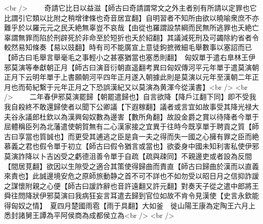 <br />
　　奇請它比日以益滋【師古曰奇請謂常文之外主者别有所請以定罪也它比謂引它類以比附之稍增律條也奇音居宜翻】自明習者不知所由欲以曉喻衆庶不亦難乎於以羅元元之民夭絶無辜豈不哀哉【由從也羅謂設禁綱而民無所逃罪也夭絶亡辜謂無罪而陷於刑辟死於非命至於短折也夭於紹翻】其議減死刑及可蠲除約省者令較然易知條奏【易以豉翻】時有司不能廣宣上意徒鉤摭微細毛舉數事以塞詔而已【師古曰毛舉言舉毫毛之事輕小之甚塞猶當也塞悉則翻】　匈奴單于遣右臯林王伊邪莫演等奉獻朝正月【師古曰演音衍朝直遥翻考異曰匈奴傳河平元年單于遣莫演朝正月下云明年單于上書願朝河平四年正月遂入朝據此則是莫演以元年至漢朝二年正月也而荀紀繫于元年正月之下恐誤漢紀又以莫演為黄渾今從漢書】<br />
<br />
　　二年春伊邪莫演罷歸【朝罷遣歸也】自言欲降【降戶江翻下同】即不受我我自殺終不敢還歸使者以聞下公卿議【下遐稼翻】議者或言宜如故事受其降光禄大夫谷永議郎杜欽以為漢興匈奴數為邊害【數所角翻】故設金爵之賞以待降者今單于屈體稱臣列為北藩遣使朝賀無有二心漢家接之宜異于往時今既享單于聘貢之質【師古曰享當也質誠也】而更受其逋逃之臣是貪一夫之得而失一國之心擁有罪之臣而絶慕義之君也假令單于初立【師古曰假令猶言或當也】欲委身中國未知利害私使伊邪莫演詐降以卜吉凶受之虧德沮善令單于自疏【疏與疎同】不親邊吏或者設為反間【間居莧翻】欲因以生隙受之適合其策使得歸曲而責直【師古曰歸曲於漢而以直義來責也】此誠邊境安危之原師旅動静之首不可不詳也不如勿受以昭日月之信抑詐諼之謀懷附親之心便【師古曰諼詐辭也音許遠翻又許元翻】對奏天子從之遣中郎將王舜往問降狀伊邪莫演曰我病狂妄言耳遣去歸到官位如故不肯令見漢使【史言永欽能得匈奴之情】　夏四月楚國雨雹【雨于具翻】大如釜　徙山陽王康為定陶王六月上悉封諸舅王譚為平阿侯商為成都侯立為<br />
<br />
